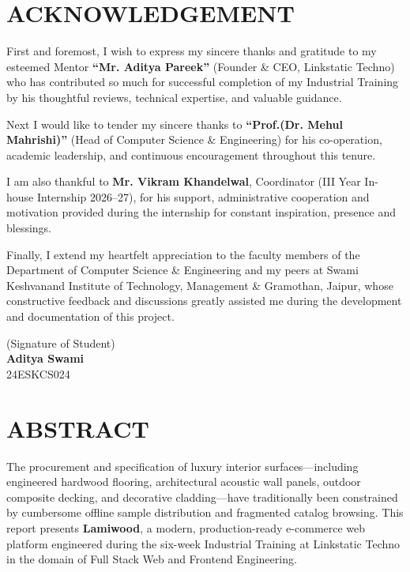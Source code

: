 \documentclass[12pt,a4paper]{report}
\begin{document}
\newpage

\chapter*{ACKNOWLEDGEMENT}
First and foremost, I wish to express my sincere thanks and gratitude to my esteemed Mentor \textbf{``Mr. Aditya Pareek''} (Founder \& CEO, Linkstatic Techno) who has contributed so much for successful completion of my Industrial Training by his thoughtful reviews, technical expertise, and valuable guidance.

Next I would like to tender my sincere thanks to \textbf{``Prof.(Dr. Mehul Mahrishi)''} (Head of Computer Science \& Engineering) for his co-operation, academic leadership, and continuous encouragement throughout this tenure.

I am also thankful to \textbf{Mr. Vikram Khandelwal}, Coordinator (III Year In-house Internship 2026--27), for his support, administrative cooperation and motivation provided during the internship for constant inspiration, presence and blessings.

Finally, I extend my heartfelt appreciation to the faculty members of the Department of Computer Science \& Engineering and my peers at Swami Keshvanand Institute of Technology, Management \& Gramothan, Jaipur, whose constructive feedback and discussions greatly assisted me during the development and documentation of this project.

\vspace{3cm}
\begin{flushright}
(Signature of Student)\\[0.4cm]
\textbf{Aditya Swami}\\
24ESKCS024
\end{flushright}

\newpage

\chapter*{ABSTRACT}
The procurement and specification of luxury interior surfaces---including engineered hardwood flooring, architectural acoustic wall panels, outdoor composite decking, and decorative cladding---have traditionally been constrained by cumbersome offline sample distribution and fragmented catalog browsing. This report presents \textbf{Lamiwood}, a modern, production-ready e-commerce web platform engineered during the six-week Industrial Training at Linkstatic Techno in the domain of Full Stack Web and Frontend Engineering.
\end{document}
